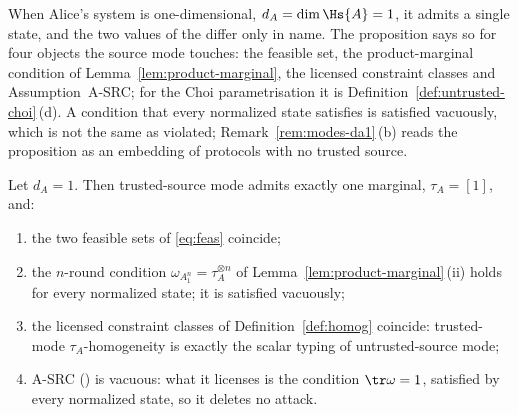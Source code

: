
When Alice's system is one-dimensional, $d_A=\dim\Hs{A}=1$, it admits a
single state, and the two values of the  differ only in
name. The proposition says so for four objects the source mode touches: the
feasible set, the product-marginal condition of
Lemma~\ref{lem:product-marginal}, the licensed constraint classes and
Assumption~A-SRC; for the Choi parametrisation it is
Definition~\ref{def:untrusted-choi}\,(d). A condition that every
normalized state satisfies is satisfied vacuously, which is not the same as
violated; Remark~\ref{rem:modes-da1}\,(b) reads the proposition as an
embedding of protocols with no trusted source.

\begin{proposition}\label{prop:trivial-alice-system}
Let $d_A=1$. Then trusted-source mode admits exactly one marginal,
$\tau_A=[1]$, and:
\begin{enumerate}[label=(\roman*),leftmargin=2.2em]
\item the two feasible sets of \eqref{eq:feas} coincide;
\item the $n$-round condition $\omega_{A_1^n}=\tau_A^{\otimes n}$ of
Lemma~\ref{lem:product-marginal}\,(ii) holds for every normalized state; it is
satisfied vacuously;
\item the licensed constraint classes of Definition~\ref{def:homog}
coincide: trusted-mode $\tau_A$-homogeneity is exactly the scalar typing
of untrusted-source mode;
\item A-SRC () is vacuous: what it
licenses is the condition $\tr\omega=1$, satisfied by every normalized
state, so it deletes no attack.
\end{enumerate}
\end{proposition}


